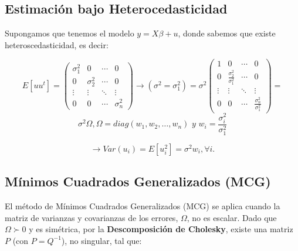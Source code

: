 \documentclass[a4paper,12pt]{article}
\newcommand{\ecuacion}[1]{\ensuremath{#1}}
\begin{document}
\subsection{Estimación bajo Heterocedasticidad}

Supongamos que tenemos el modelo \ecuacion{y = X\beta + u}, donde sabemos que existe heteroscedasticidad, es decir:

\begin{equation}
    E[uu^t] = \begin{pmatrix}
        \sigma_1^2 & 0 & \cdots & 0 \\
        0 & \sigma_2^2 & \cdots & 0 \\
        \vdots & \vdots & \ddots & \vdots \\
        0 & 0 & \cdots & \sigma_n^2
    \end{pmatrix} \rightarrow (\sigma^2 = \sigma_1^2)  = \sigma^2 \begin{pmatrix}
        1 & 0 & \cdots & 0 \\
        0 & \frac{\sigma_2^2}{\sigma_1^2} & \cdots & 0 \\
        \vdots & \vdots & \ddots & \vdots \\
        0 & 0 & \cdots & \frac{\sigma_n^2}{\sigma_1^2}
    \end{pmatrix} = 
\end{equation}
\[\sigma^2 \Omega, \Omega = diag (w_1, w_2, \ldots, w_n) \,\, y \,\, w_i = \frac{\sigma_i^2}{\sigma_1^2}\]

\[\rightarrow Var(u_i)  = E[u_i^2] = \sigma^2w_i , \forall i.\]







\subsection{Mínimos Cuadrados Generalizados (MCG)}

El método de Mínimos Cuadrados Generalizados (MCG) se aplica cuando la matriz de varianzas y covarianzas de los errores, $\Omega$, no es escalar. Dado que $\Omega \succ 0$ y es simétrica, por la \textbf{Descomposición de Cholesky}, existe una matriz $P$ (con $P = Q^{-1}$), no singular, tal que:
\end{document}
